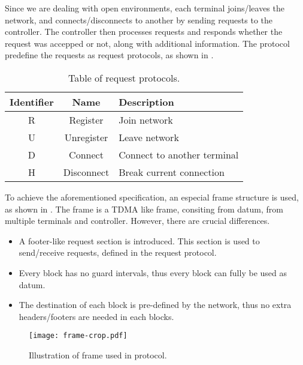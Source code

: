 ﻿\documentclass[twocolumn,9pt]{ltjsarticle}
\renewcommand{\ref}{\Cref}
\begin{document}
Since we are dealing with open environments, each terminal joins/leaves the network, and connects/disconnects to another by sending requests to the controller.
The controller then processes requests and responds whether the request was accepped or not, along with additional information.
The protocol predefine the requests as request protocols, as shown in \ref{tab:request}.

\begin{table}[tb]
  \centering
  \caption{\label{tab:request}
    Table of request protocols.
  }
  \begin{tabularx}{\linewidth}{ccl}
    \hline
    Identifier & Name & Description\\
    \hline \hline
    R & Register & Join network\\
    U & Unregister & Leave network\\
    D & Connect & Connect to another terminal\\
    H & Disconnect & Break current connection\\
    \hline
  \end{tabularx}
\end{table}

To achieve the aforementioned specification, an especial frame structure is used, as shown in \ref{fig:frame}.
The frame is a TDMA like frame, consiting from datum, from multiple terminals and controller.
However, there are crucial differences.
\begin{itemize}
\item A footer-like request section is introduced.
  This section is used to send/receive requests, defined in the request protocol.
\item Every block has no guard intervals, thus every block can fully be used as datum.
  \item The destination of each block is pre-defined by the network, thus no extra headers/footers are needed in each blocks.
\end{itemize}

\begin{figure}[tb]
  \centering
  \texttt{[image: frame-crop.pdf]}
  \caption{\label{fig:frame}
    Illustration of frame used in protocol.
  }
\end{figure}
\end{document}
